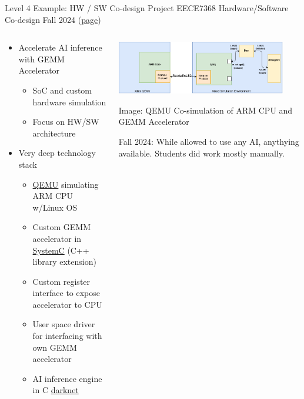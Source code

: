 \documentclass[xcolor=dvipsnames, aspectratio=169]{beamer}
\begin{document}
\begin{frame}{Level 4 Example: HW / SW Co-design Project} 
    \centering EECE7368 Hardware/Software Co-design Fall 2024 (\href{https://neu-ece-7368.github.io/}{page})   \begin{columns}[T]
    \begin{column}{0.4\textwidth}
      \begin{itemize}
        \item Accelerate AI inference with GEMM Accelerator 
        \begin{itemize}
          \item SoC and custom hardware simulation
          \item Focus on HW/SW architecture
        \end{itemize}
        \item Very deep technology stack
        \begin{itemize}\footnotesize
            \item \href{https://www.qemu.org/}{QEMU} simulating ARM CPU w/Linux OS
            \item Custom GEMM accelerator in \href{https://systemc.org/}{SystemC} (C++ library extension)
            \item Custom register interface to expose accelerator to CPU 
            \item User space driver for interfacing with own GEMM accelerator
            \item AI inference engine in C \href{https://github.com/pjreddie/darknet}{darknet}
          \end{itemize}
      \end{itemize}
    \end{column}
    \begin{column}{0.6\textwidth}
      \hfill \includegraphics[width=0.9\textwidth]{images/QemuCosim.png}
      \tiny\centerline{Image: QEMU Co-simulation of ARM CPU and GEMM Accelerator}

      \begin{alertbox}
        Fall 2024: While allowed to use any AI, anythying available. Students did work mostly manually. 
      \end{alertbox}
    \end{column}
  \end{columns}
\end{frame}
\end{document}
